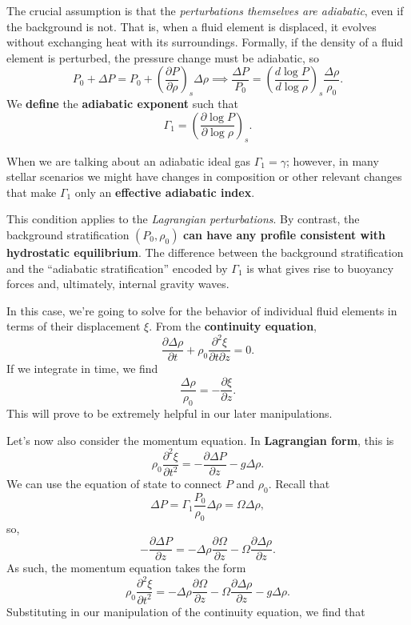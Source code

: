 The crucial assumption is that the \emph{perturbations themselves are adiabatic}, even if the background is not. That is, when a fluid element is displaced, it evolves without exchanging heat with its surroundings. Formally, if the density of a fluid element is perturbed, the pressure change must be adiabatic, so
\[
P_0 + \Delta P = P_0 + \left(\frac{\partial P}{\partial \rho}\right)_{s} \Delta \rho \implies  \frac{\Delta P}{P_0} = \left(\frac{d\log P}{d\log \rho}\right)_s \frac{\Delta \rho}{\rho_0}.
\]
We \textbf{define} the \textbf{adiabatic exponent} such that
\[
\Gamma_1 = \left(\frac{\partial \log P}{\partial \log \rho}\right)_s.
\]
\begin{ideabox}
    When we are talking about an adiabatic ideal gas $\Gamma_1 = \gamma$; however, in many stellar scenarios we might have changes in composition or other relevant changes that make $\Gamma_1$ only an \textbf{effective adiabatic index}.
\end{ideabox}
This condition applies to the \emph{Lagrangian perturbations}. By contrast, the background stratification $(P_0,\rho_0)$ \textbf{can have any profile consistent with hydrostatic equilibrium}. The difference between the background stratification and the ``adiabatic stratification'' encoded by $\Gamma_1$ is what gives rise to buoyancy forces and, ultimately, internal gravity waves.
\par
In this case, we're going to solve for the behavior of individual fluid elements in terms of their displacement $\xi$. From the \textbf{continuity equation},
\[
\frac{\partial \Delta \rho}{\partial t} + \rho_0 \frac{\partial^2 \xi}{\partial t \partial z} = 0.
\]
If we integrate in time, we find
\[
\frac{\Delta \rho}{\rho_0} = - \frac{\partial \xi}{\partial z}.
\]
This will prove to be extremely helpful in our later manipulations.
\par
Let's now also consider the momentum equation. In \textbf{Lagrangian form}, this is
\[
\rho_0\frac{\partial^2 \xi}{\partial t^2} = - \frac{\partial \Delta P}{\partial z} - g\Delta \rho.
\]
We can use the equation of state to connect $P$ and $\rho_0$. Recall that
\[
\Delta P = \Gamma_1 \frac{P_0}{\rho_0} \Delta \rho = \Omega \Delta \rho,
\]
so,
\[
-\frac{\partial \Delta P}{\partial z} = -\Delta \rho\frac{\partial \Omega}{\partial z} - \Omega\frac{\partial \Delta \rho}{\partial z}.
\]
As such, the momentum equation takes the form
\[
\rho_0 \frac{\partial^2\xi}{\partial t^2} = - \Delta \rho \frac{\partial \Omega}{\partial z} - \Omega \frac{\partial \Delta \rho}{\partial z} - g\Delta \rho.
\]
Substituting in our manipulation of the continuity equation, we find that
